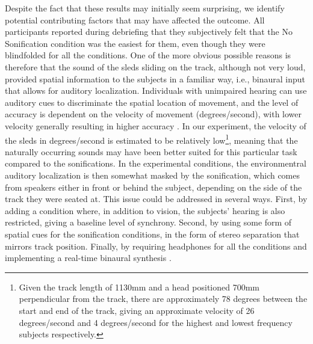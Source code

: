 \documentclass[10pt,a4paper,onecolumn]{article}
\begin{document}
Despite the fact that these results may initially seem surprising, we identify potential contributing factors that may have affected the outcome. All participants reported during debriefing that they subjectively felt that the No Sonification condition was the easiest for them, even though they were blindfolded for all the conditions. One of the more obvious possible reasons is therefore that the sound of the sleds sliding on the track, although not very loud, provided spatial information to the subjects in a familiar way, i.e., binaural input that allows for auditory localization. Individuals with unimpaired hearing can use auditory cues to discriminate the spatial location of movement, and the level of accuracy is dependent on the velocity of movement (degrees/second), with lower velocity generally resulting in higher accuracy \autocite{carlilePerceptionAuditoryMotion2016}. In our experiment, the velocity of the sleds in degrees/second is estimated to be relatively low\footnote{Given the track length of 1130mm and a head positioned 700mm perpendicular from the track, there are approximately 78 degrees between the start and end of the track, giving an approximate velocity of 26 degrees/second and 4 degrees/second for the highest and lowest frequency subjects respectively.}, meaning that the naturally occurring sounds may have been better suited for this particular task compared to the sonifications. In the experimental conditions, the environmentral auditory localization is then somewhat masked by the sonification, which comes from speakers either in front or behind the subject, depending on the side of the track they were seated at. This issue could be addressed in several ways. First, by adding a condition where, in addition to vision, the subjects' hearing is also restricted, giving a baseline level of synchrony. Second, by using some form of spatial cues for the sonification conditions, in the form of stereo separation that mirrors track position. Finally, by requiring headphones for all the conditions and implementing a real-time binaural synthesis \autocite{tommasiniComputationalModelImplement2019}.
\end{document}
